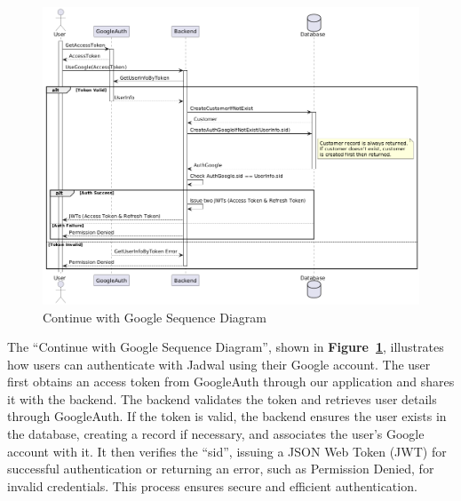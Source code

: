 \begin{figure}[!h]
  \centering
  \includegraphics[width=\textwidth]{images/docs/diagrams/sequence-diagrams/all-sequence-diagrams/Continue with Google.png}
  \caption{Continue with Google Sequence Diagram}
  \label{fig:seq/continue-with-google}
\end{figure}

The ``Continue with Google Sequence Diagram'', shown in \textbf{Figure~\ref{fig:seq/continue-with-google}}, illustrates how users can authenticate with Jadwal using their Google account. The user first obtains an access token from GoogleAuth through our application and shares it with the backend. The backend validates the token and retrieves user details through GoogleAuth. If the token is valid, the backend ensures the user exists in the database, creating a record if necessary, and associates the user’s Google account with it. It then verifies the ``sid'', issuing a JSON Web Token (JWT) for successful authentication or returning an error, such as Permission Denied, for invalid credentials. This process ensures secure and efficient authentication.